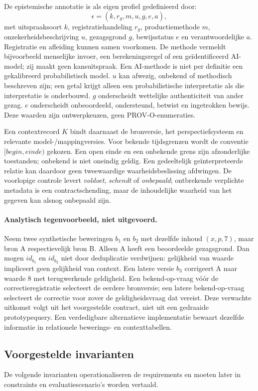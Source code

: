 De epistemische annotatie is als eigen profiel gedefinieerd door:
\[
\epsilon=(k,r_g,m,u,g,e,a),
\]
met uitspraaksoort $k$, registratiehandeling $r_g$, productiemethode $m$, onzekerheidsbeschrijving $u$, gezagsgrond $g$, bewijsstatus $e$ en verantwoordelijke $a$. Registratie en afleiding kunnen samen voorkomen. De methode vermeldt bijvoorbeeld menselijke invoer, een berekeningsregel of een geïdentificeerd AI-model; zij maakt geen kansuitspraak. Een AI-methode is niet per definitie een gekalibreerd probabilistisch model. $u$ kan afwezig, onbekend of methodisch beschreven zijn; een getal krijgt alleen een probabilistische interpretatie als die interpretatie is onderbouwd. $g$ onderscheidt wettelijke authenticiteit van ander gezag. $e$ onderscheidt onbeoordeeld, ondersteund, betwist en ingetrokken bewijs. Deze waarden zijn ontwerpkeuzen, geen PROV-O-enumeraties.

Een contextrecord $K$ bindt daarnaast de bronversie, het perspectiefsysteem en relevante model-/mappingversies. Voor bekende tijdsgrenzen wordt de conventie $[begin,einde)$ gekozen. Een open einde en een onbekende grens zijn afzonderlijke toestanden; onbekend is niet oneindig geldig. Een gedeeltelijk geïnterpreteerde relatie kan daardoor geen tweewaardige waarheidsbeslissing afdwingen. De voorlopige controle levert \emph{voldoet}, \emph{schendt} of \emph{onbepaald}; ontbrekende verplichte metadata is een contractschending, maar de inhoudelijke waarheid van het gegeven kan alsnog onbepaald zijn.

\paragraph{Analytisch tegenvoorbeeld, niet uitgevoerd.}
Neem twee synthetische beweringen $b_1$ en $b_2$ met dezelfde inhoud $(x,p,7)$, maar bron A respectievelijk bron B. Alleen A heeft een beoordeelde gezagsgrond. Dan mogen $id_{b_1}$ en $id_{b_2}$ niet door deduplicatie verdwijnen: gelijkheid van waarde impliceert geen gelijkheid van context. Een latere versie $b_3$ corrigeert A naar waarde 8 met terugwerkende geldigheid. Een bekend-op-vraag vóór de correctieregistratie selecteert de eerdere bronversie; een latere bekend-op-vraag selecteert de correctie voor zover de geldigheidsvraag dat vereist. Deze verwachte uitkomst volgt uit het voorgestelde contract, niet uit een gedraaide prototypequery. Een verdedigbare alternatieve implementatie bewaart dezelfde informatie in relationele bewerings- en contexttabellen.

\subsection{Voorgestelde invarianten}
De volgende invarianten operationaliseren de requirements en moeten later in constraints en evaluatiescenario’s worden vertaald.

